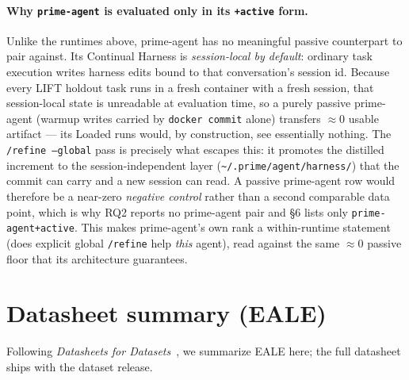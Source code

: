 \documentclass{article}
\begin{document}
\paragraph{Why \texttt{prime-agent} is evaluated only in its \texttt{+active} form.} Unlike the runtimes above, prime-agent has no meaningful passive counterpart to pair against. Its Continual Harness is \emph{session-local by default}: ordinary task execution writes harness edits bound to that conversation's session id. Because every LIFT holdout task runs in a fresh container with a fresh session, that session-local state is unreadable at evaluation time, so a purely passive prime-agent (warmup writes carried by \texttt{docker commit} alone) transfers $\approx$0 usable artifact --- its Loaded runs would, by construction, see essentially nothing. The \texttt{/refine --global} pass is precisely what escapes this: it promotes the distilled increment to the session-independent layer (\texttt{\textasciitilde/.prime/agent/harness/}) that the commit can carry and a new session can read. A passive prime-agent row would therefore be a near-zero \emph{negative control} rather than a second comparable data point, which is why RQ2 reports no prime-agent pair and \S6 lists only \texttt{prime-agent+active}. This makes prime-agent's own rank a within-runtime statement (does explicit global \texttt{/refine} help \emph{this} agent), read against the same $\approx$0 passive floor that its architecture guarantees.


\section{Datasheet summary (EALE)}

Following \emph{Datasheets for Datasets}~\citep{gebru2021datasheets}, we summarize EALE here; the full datasheet ships with the dataset release.
\end{document}
